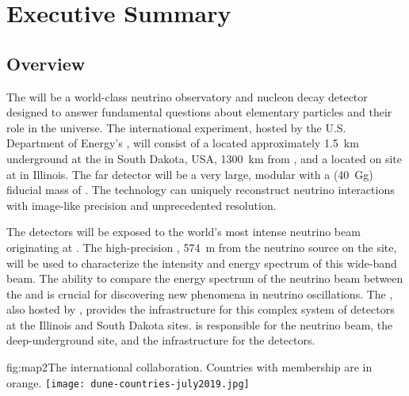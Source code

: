 \chapter{Executive Summary}
\label{ch:exec-overall}

\section{Overview}
\label{sec:exec-overall-1}

The  will be a world-class neutrino observatory and nucleon decay detector designed to answer fundamental questions about elementary particles and their role in the universe. The international  experiment, hosted by the U.S. Department of Energy's , will consist of a  located approximately \SI{1.5}{km} underground at the  in South Dakota, USA,  \SI{1300}{\km} from , and a  located on site at  in Illinois. The far detector will be a very large, modular  with a \fdfiducialmass (\SI{40}{\giga\gram}) fiducial mass of . The  technology 
can uniquely reconstruct neutrino interactions with image-like precision and unprecedented resolution. 

The  detectors will be exposed to the world's most intense neutrino beam originating at . The high-precision , \SI{574}{m} from the neutrino source on the  site, will be used to characterize the intensity and energy spectrum of this wide-band beam. The ability to compare the energy spectrum of the neutrino beam between the  and 
is crucial for discovering new phenomena in neutrino oscillations. The , also hosted by , provides the infrastructure for this complex system of detectors at the Illinois and South Dakota sites.  is responsible for the neutrino beam, the deep-underground site, and the infrastructure for the  detectors. 

\begin{dunefigure}{fig:map2}{The international 
collaboration. Countries with  membership are in orange.}
\texttt{[image: dune-countries-july2019.jpg]}  
\end{dunefigure} %

